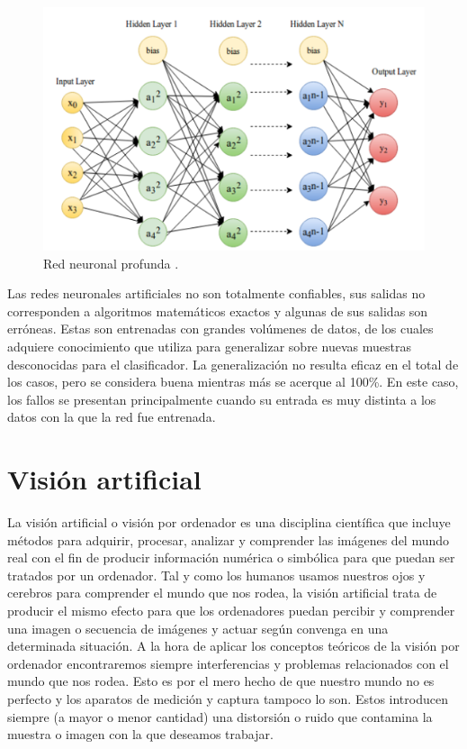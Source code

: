 \begin{figure}[th]
\centering
\includegraphics[scale = 1.1]{Figures/figura_05.PNG}
\decoRule
\caption[Neurona]{Red neuronal profunda \parencite{r7}.}
\label{fig:deep}
\end{figure}

Las redes neuronales artificiales no son totalmente confiables, sus salidas no corresponden a algoritmos matemáticos exactos y algunas de sus salidas son erróneas. Estas son entrenadas con grandes volúmenes de datos, de los cuales adquiere conocimiento que utiliza para generalizar sobre nuevas muestras desconocidas para el clasificador. La generalización no resulta eficaz en el total de los casos, pero se considera buena mientras más se acerque al 100\%. En este caso, los fallos se presentan principalmente cuando su entrada es muy distinta a los datos con la que la red fue entrenada.


\section{Visión artificial}

La visión artificial o visión por ordenador es una disciplina científica que incluye métodos para adquirir, procesar, analizar y comprender las imágenes del mundo real con el fin de producir información numérica o simbólica para que puedan ser tratados por un ordenador. Tal y como los humanos usamos nuestros ojos y cerebros para comprender el mundo que nos rodea, la visión artificial trata de producir el mismo efecto para que los ordenadores puedan percibir y comprender una imagen o secuencia de imágenes y actuar según convenga en una determinada situación.
A la hora de aplicar los conceptos teóricos de la visión por ordenador encontraremos siempre interferencias y problemas relacionados con el mundo que nos rodea. Esto es por el mero hecho de que nuestro mundo no es perfecto y los aparatos de medición y captura tampoco lo son. Estos introducen siempre (a mayor o menor cantidad) una distorsión o ruido que contamina la muestra o imagen con la que deseamos trabajar.

